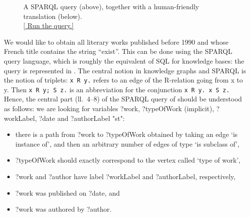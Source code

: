 \begin{figure}
	
	
	\caption{
		\label{fig:sparql}
		A SPARQL query (above), together with a human-friendly translation (below).\\
	\href{https://query.wikidata.org/\#SELECT\%20DISTINCT\%20\%3Fwork\%20\%3FworkLabel\%20\%3FauthorLabel\%0AWHERE\%0A\%7B\%0A\%20\%20\%3Fwork\%09wdt\%3AP31\%2Fwdt\%3AP279\%2a\%20wd\%3AQ7725634\%3B\%0A\%20\%20\%20\%20\%20\%20\%20\%20rdfs\%3Alabel\%20\%3FworkLabel\%3B\%0A\%20\%20\%09\%09wdt\%3AP577\%20\%3Fdate\%3B\%0A\%20\%20\%20\%20\%20\%20\%20\%20wdt\%3AP50\%20\%3Fauthor.\%0A\%20\%20\%3Fauthor\%20rdfs\%3Alabel\%20\%3FauthorLabel.\%0A\%20\%20FILTER\%28LANG\%28\%3FworkLabel\%29\%20\%3D\%20\%22fr\%22\%20\%26\%26\%20LANG\%28\%3FauthorLabel\%29\%20\%3D\%20\%22fr\%22\%29.\%0A\%20\%20FILTER\%28CONTAINS\%28\%3FworkLabel\%2C\%20\%22exist\%22\%29\%29.\%0A\%20\%20FILTER\%28YEAR\%28\%3Fdate\%29\%20\%3C\%3D\%201990\%29.\%0A\%7D\%0ALIMIT\%207}{[\raisebox{-.4ex}{\HandRight} Run the query.]}
	}
\end{figure}
We would like to obtain all literary works published before 1990 and whose
French title contains the string ``exist''.
This can be done using the SPARQL query language, which is roughly the equivalent
of SQL for knowledge bases: the query is represented in .
The central notion in knowledge graphs and SPARQL is the notion of triplets:
\lstinline[language=SQL]{x R y.} refers to an edge of the \textsf{R}-relation
going from \textsf{x} to \textsf{y}.
Then \lstinline[language=SQL]{x R y; S z.} is an abbreviation for
the conjunction \lstinline[language=SQL]{x R y. x S z.}
Hence, the central part (ll.~4--8) of the SPARQL query of 
should be understood as follows:
we are looking for variables \textsf{?work}, \textsf{?typeOfWork} (implicit),
\textsf{?workLabel}, \textsf{?date} and \textsf{?authorLabel} "st":
\begin{itemize}
	\item there is a path from \textsf{?work} to \textsf{?typeOfWork}
		obtained by taking an edge `is instance of', and then an arbitrary number
		of edges of type `is subclass of',
	\item \textsf{?typeOfWork} should exactly correspond to the vertex called `type of work',
	\item \textsf{?work} and \textsf{?author} have label \textsf{?workLabel} and \textsf{?authorLabel}, respectively, 
	\item \textsf{?work} was published on \textsf{?date}, and
	\item \textsf{?work} was authored by \textsf{?author}.
\end{itemize}
